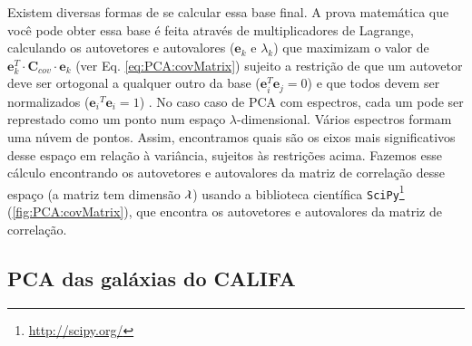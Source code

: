 Existem diversas formas de se calcular essa base final. A prova matemática que
você pode obter essa base é feita através de multiplicadores de Lagrange,
calculando os autovetores e autovalores ($\mathbf{e}{}_k$ e $\lambda_k$) que
maximizam o valor de $\mathbf{e}{}_k^T \cdot \mathbf{C}{}_{cov} \cdot
\mathbf{e}{}_k$ (ver Eq. \ref{eq:PCA:covMatrix}) sujeito a restrição de que um
autovetor deve ser ortogonal a qualquer outro da base ($\mathbf{e}{}_i^T
\mathbf{e}{}_j = 0$) e que todos devem ser normalizados ($\mathbf{e}{}_i{}^T
\mathbf{e}{}_i = 1$) \citep[][p. 5-6]{JolliffePCA1986}. No caso caso de PCA com
espectros, cada um pode ser represtado como um ponto num espaço
$\lambda$-dimensional. Vários espectros formam uma núvem de pontos. Assim,
encontramos quais são os eixos mais significativos desse espaço em relação à
variância, sujeitos às restrições acima. Fazemos esse cálculo encontrando os
autovetores e autovalores da matriz de correlação desse espaço (a matriz tem
dimensão $\lambda \time \lambda$) usando a biblioteca científica
\texttt{SciPy}\footnote{\url{http://scipy.org/}} (\ref{fig:PCA:covMatrix}), que
encontra os autovetores e autovalores da matriz de correlação.

\subsection{PCA das galáxias do CALIFA}

